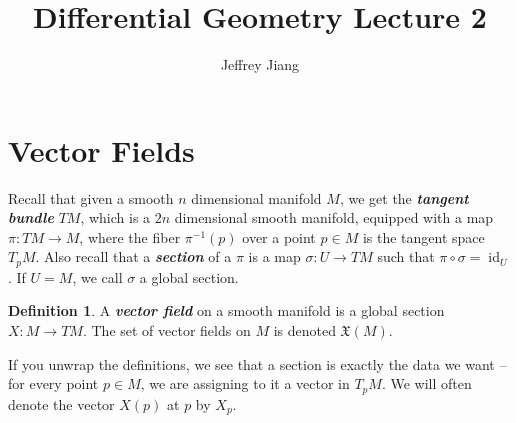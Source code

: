 \documentclass[psamsfonts]{amsart}
\theoremstyle{definition}
\newtheorem{defn}[thm]{Definition}
\theoremstyle{remark}
\newcommand{\ib}[1]{\textbf{\textit{#1}}}
\newcommand{\inv}{^{-1}}
\DeclareMathOperator{\id}{id}
\begin{document}
%
\author{Jeffrey Jiang}
%
\title{Differential Geometry Lecture 2}
%
\setcounter{section}{0}
%
\maketitle
%
\section{Vector Fields}
%
Recall that given a smooth $n$ dimensional manifold $M$, we get the
\ib{tangent bundle} $TM$, which is a $2n$ dimensional smooth manifold, equipped
with a map $\pi : TM \to M$, where the fiber $\pi\inv(p)$ over a point $p \in M$
is the tangent space $T_pM$. Also recall that a \ib{section} of a $\pi$
is a map $\sigma : U \to TM$ such that $\pi \circ \sigma = \id_U$. If $U = M$,
we call $\sigma$ a global section.
%
\begin{defn}
A \ib{vector field} on a smooth manifold is a global section $X : M \to TM$.
The set of vector fields on $M$ is denoted $\mathfrak{X}(M)$.
\end{defn}
%
If you unwrap the definitions, we see that a section is exactly the data we
want -- for every point $p \in M$, we are assigning to it a vector in $T_pM$.
We will often denote the vector $X(p)$ at $p$ by $X_p$. \\
\end{document}
